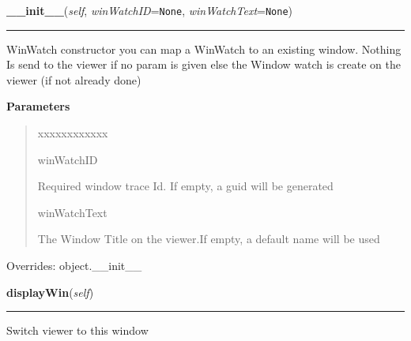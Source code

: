 \hspace{.8\funcindent}\begin{boxedminipage}{\funcwidth}

    \raggedright \textbf{\_\_init\_\_}(\textit{self}, \textit{winWatchID}={\tt None}, \textit{winWatchText}={\tt None})

    \vspace{-1.5ex}

    \rule{\textwidth}{0.5\fboxrule}
\setlength{\parskip}{2ex}
    WinWatch constructor you can map a WinWatch to an existing window. 
    Nothing Is send to the viewer if no param is given else the Window 
    watch is create on the viewer (if not already done)

\setlength{\parskip}{1ex}
      \textbf{Parameters}
      \vspace{-1ex}

      \begin{quote}
        \begin{Ventry}{xxxxxxxxxxxx}

          \item[winWatchID]

          Required window trace Id. If empty, a guid will be generated

          \item[winWatchText]

          The Window Title on the viewer.If empty, a default name will be 
          used

        \end{Ventry}

      \end{quote}

      Overrides: object.\_\_init\_\_

    \end{boxedminipage}

    \label{tracetool:WinWatch:displayWin}

    \vspace{0.5ex}

\hspace{.8\funcindent}\begin{boxedminipage}{\funcwidth}

    \raggedright \textbf{displayWin}(\textit{self})

    \vspace{-1.5ex}

    \rule{\textwidth}{0.5\fboxrule}
\setlength{\parskip}{2ex}
    Switch viewer to this window

\setlength{\parskip}{1ex}
    \end{boxedminipage}

